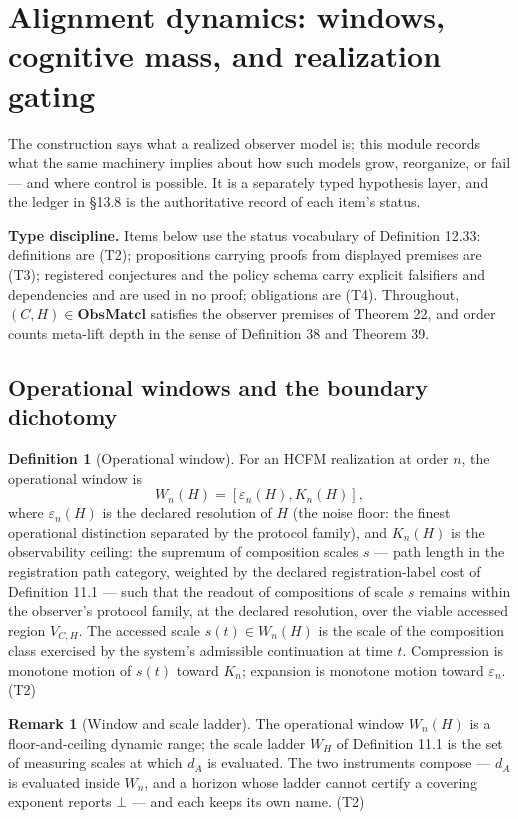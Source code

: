 \documentclass[11pt]{article}
\theoremstyle{definition}
\newtheorem{definition}{Definition}
\newtheorem{remark}{Remark}
\newcommand{\ObsMatcl}{\mathbf{ObsMatcl}}
\begin{document}
\section{Alignment dynamics: windows, cognitive mass, and realization gating}

The construction says what a realized observer model is; this module records what the same machinery implies about how such models grow, reorganize, or fail --- and where control is possible. It is a separately typed hypothesis layer, and the ledger in \S13.8 is the authoritative record of each item's status.

\noindent\textbf{Type discipline.} Items below use the status vocabulary of Definition 12.33: definitions are (T2); propositions carrying proofs from displayed premises are (T3); registered conjectures and the policy schema carry explicit falsifiers and dependencies and are used in no proof; obligations are (T4). Throughout, $(C, H) \in \ObsMatcl$ satisfies the observer premises of Theorem 22, and order counts meta-lift depth in the sense of Definition 38 and Theorem 39.

\subsection{Operational windows and the boundary dichotomy}

\begin{definition}[Operational window]
For an HCFM realization at order $n$, the operational window is
\[
W_n(H) = [\varepsilon_n(H), K_n(H)],
\]
where $\varepsilon_n(H)$ is the declared resolution of $H$ (the noise floor: the finest operational distinction separated by the protocol family), and $K_n(H)$ is the observability ceiling: the supremum of composition scales $s$ --- path length in the registration path category, weighted by the declared registration-label cost of Definition 11.1 --- such that the readout of compositions of scale $s$ remains within the observer's protocol family, at the declared resolution, over the viable accessed region $V_{C,H}$. The accessed scale $s(t) \in W_n(H)$ is the scale of the composition class exercised by the system's admissible continuation at time $t$. Compression is monotone motion of $s(t)$ toward $K_n$; expansion is monotone motion toward $\varepsilon_n$. (T2)
\end{definition}

\begin{remark}[Window and scale ladder]
The operational window $W_n(H)$ is a floor-and-ceiling dynamic range; the scale ladder $W_H$ of Definition 11.1 is the set of measuring scales at which $d_A$ is evaluated. The two instruments compose --- $d_A$ is evaluated inside $W_n$, and a horizon whose ladder cannot certify a covering exponent reports $\bot$ --- and each keeps its own name. (T2)
\end{remark}
\end{document}
